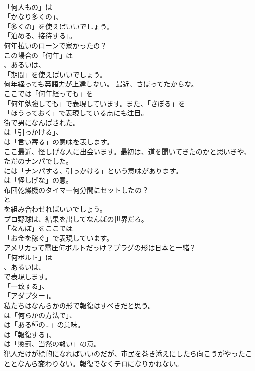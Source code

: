 \documentclass[8pt]{extreport}
\begin{document}
\begin{CJK}{UTF8}{min}
\\	「何人もの」は
\\	「かなり多くの」、
\\	「多くの」を使えばいいでしょう。
\\	「泊める、接待する」。	
\\	何年払いのローンで家かったの？ 
\\	この場合の「何年」は
\\	、あるいは、
\\	「期間」を使えばいいでしょう。	
\\	何年経っても英語力が上達しない。 最近、さぼってたからな。 
\\	ここでは「何年経っても」を
\\	「何年勉強しても」で表現しています。また、「さぼる」を
\\	「ほうっておく」で表現している点にも注目。	
\\	街で男になんぱされた。 
\\	は「引っかける」、
\\	は「言い寄る」の意味を表します。	
\\	ここ最近、怪しげな人に出会います。最初は、道を聞いてきたのかと思いきや、ただのナンパでした。 
\\	には「ナンパする、引っかける」という意味があります。
\\	は「怪しげな」の意。	
\\	布団乾燥機のタイマー何分間にセットしたの？ 
\\	と
\\	を組み合わせればいいでしょう。	
\\	プロ野球は、結果を出してなんぼの世界だろ。 
\\	「なんぼ」をここでは
\\	「お金を稼ぐ」で表現しています。	
\\	アメリカって電圧何ボルトだっけ？プラグの形は日本と一緒？ 
\\	「何ボルト」は
\\	、あるいは、
\\	で表現します。
\\	「一致する」、
\\	「アダプター」。	
\\	私たちはなんらかの形で報復はすべきだと思う。 
\\	は「何らかの方法で」、
\\	は「ある種の…」の意味。
\\	は「報復する」、
\\	は「懲罰、当然の報い」の意。	
\\	犯人だけが標的になればいいのだが、市民を巻き添えにしたら向こうがやったこととなんら変わりない。報復でなくテロになりかねない。 

\end{CJK}
\end{document}

